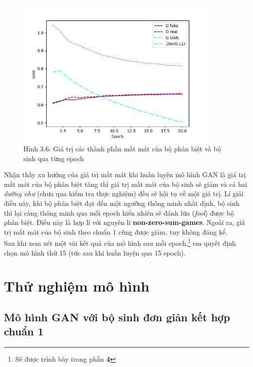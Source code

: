 \documentclass[a4paper]{article}
\begin{document}
\begin{figure}[h!]
\centering
\includegraphics[width=10cm]{images/3_6.png}
\caption{Hình 3.6: Giá trị các thành phần mất mát của bộ phân biệt và bộ sinh qua từng epoch}
\end{figure}

\noindent
Nhận thấy xu hướng của giá trị mất mát khi huấn luyện mô hình GAN là giá trị mất mát của bộ phân biệt tăng thì giá trị mất mát của bộ sinh sẽ giảm và cả hai \textit{dường như} (chưa qua kiểm tra thực nghiệm) đều sẽ hội tụ về một giá trị. Lí giải điều này, khi bộ phân biệt đạt đến một ngưỡng thông minh nhất định, bộ sinh thì lại càng thông minh qua mỗi epoch hiển nhiên sẽ đánh lừa (\textit{fool}) được bộ phân biệt. Điều này là hợp lí với nguyên lí \textbf{non-zero-sum-games}. Ngoài ra, giá trị mất mát của bộ sinh theo chuẩn 1 cũng được giảm, tuy không đáng kể.\\

\noindent
Sau khi xem xét một vài kết quả của mô hình sau mỗi epoch,\footnote{Sẽ được trình bày trong phần \textbf{4 }} em quyết định chọn mô hình thứ 15 (tức sau khi huấn luyện qua 15 epoch).

\section{Thử nghiệm mô hình}\label{testmodel}\label{experiment}

\subsection{Mô hình GAN với bộ sinh đơn giản kết hợp chuẩn 1}
\end{document}
